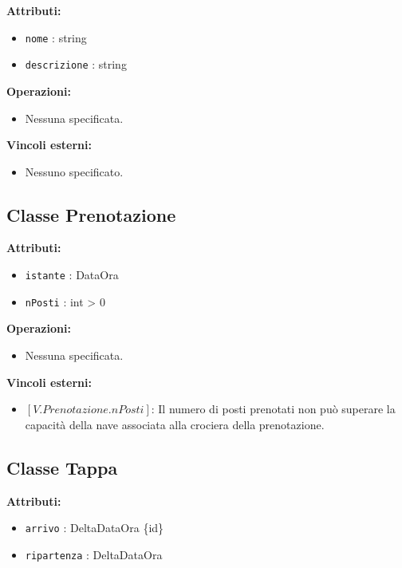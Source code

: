 \documentclass[a4paper]{scrartcl}
\begin{document}
\textbf{Attributi:}
\begin{itemize}
    \item \texttt{nome} : string
    \item \texttt{descrizione} : string
\end{itemize}

\textbf{Operazioni:}
\begin{itemize}
    \item Nessuna specificata.
\end{itemize}

\textbf{Vincoli esterni:}
\begin{itemize}
    \item Nessuno specificato.
\end{itemize}

\subsection{Classe Prenotazione}

\textbf{Attributi:}
\begin{itemize}
    \item \texttt{istante} : DataOra
    \item \texttt{nPosti} : int > 0
\end{itemize}

\textbf{Operazioni:}
\begin{itemize}
    \item Nessuna specificata.
\end{itemize}

\textbf{Vincoli esterni:}
\begin{itemize}
    \item $[V.Prenotazione.nPosti]$: Il numero di posti prenotati non può superare la capacità della nave associata alla crociera della prenotazione.
\end{itemize}

\subsection{Classe Tappa}

\textbf{Attributi:}
\begin{itemize}
    \item \texttt{arrivo} : DeltaDataOra \{id\}
    \item \texttt{ripartenza} : DeltaDataOra
\end{itemize}
\end{document}
